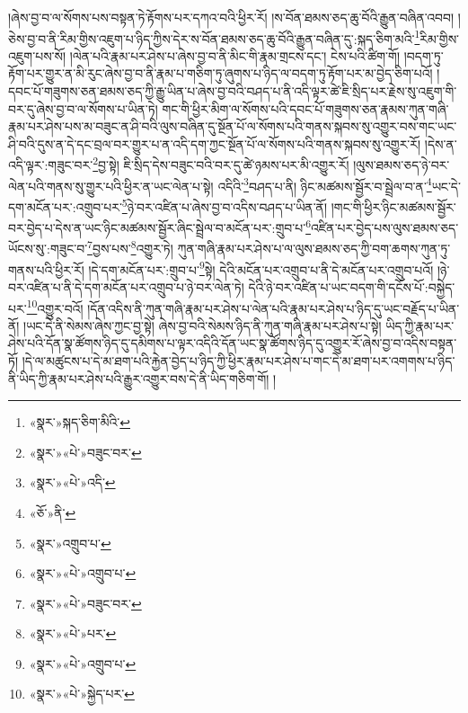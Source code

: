 །ཞེས་བྱ་བ་ལ་སོགས་པས་བསྟན་ཏེ་རྟོགས་པར་དཀའ་བའི་ཕྱིར་རོ། །ས་བོན་ཐམས་ཅད་ཆུ་བོའི་རྒྱུན་བཞིན་འབབ། །ཅེས་བྱ་བ་ནི་རིམ་གྱིས་འཇུག་པ་ཉིད་ཀྱིས་དེར་ས་བོན་ཐམས་ཅད་ཆུ་བོའི་རྒྱུན་བཞིན་དུ་:སྐད་ཅིག་མའི་\footnote{«སྣར་»སྐད་ཅིག་མིའི་}རིམ་གྱིས་འཇུག་པས་སོ། །ལེན་པའི་རྣམ་པར་ཤེས་པ་ཞེས་བྱ་བ་ནི་མིང་གི་རྣམ་གྲངས་དང་། ངེས་པའི་ཚིག་གོ། །བདག་ཏུ་རྟོག་པར་གྱུར་ན་མི་རུང་ཞེས་བྱ་བ་ནི་རྣམ་པ་གཅིག་ཏུ་ཞུགས་པ་ཉིད་ལ་བདག་ཏུ་རྟོག་པར་མ་བྱེད་ཅིག་པའོ། །དབང་པོ་གཟུགས་ཅན་ཐམས་ཅད་ཀྱི་རྒྱུ་ཡིན་པ་ཞེས་བྱ་བའི་བཤད་པ་ནི་འདི་ལྟར་ཚེ་ཇི་སྲིད་པར་རྗེས་སུ་འཇུག་གི་བར་དུ་ཞེས་བྱ་བ་ལ་སོགས་པ་ཡིན་ཏེ། གང་གི་ཕྱིར་མིག་ལ་སོགས་པའི་དབང་པོ་གཟུགས་ཅན་རྣམས་ཀུན་གཞི་རྣམ་པར་ཤེས་པས་མ་བཟུང་ན་ཤི་བའི་ལུས་བཞིན་དུ་སྔོན་པོ་ལ་སོགས་པའི་གནས་སྐབས་སུ་འགྱུར་བས་གང་ཡང་ཤི་བའི་དུས་ན་དེ་དང་བྲལ་བར་གྱུར་པ་ན་འདི་དག་ཀྱང་སྔོན་པོ་ལ་སོགས་པའི་གནས་སྐབས་སུ་འགྱུར་རོ། །དེས་ན་འདི་ལྟར་:གཟུང་བར་\footnote{«སྣར་»«པེ་»བཟུང་བར་}བྱ་སྟེ། ཇི་སྲིད་དེས་བཟུང་བའི་བར་དུ་ཚེ་ཉམས་པར་མི་འགྱུར་རོ། །ལུས་ཐམས་ཅད་ཉེ་བར་ལེན་པའི་གནས་སུ་གྱུར་པའི་ཕྱིར་ན་ཡང་ལེན་པ་སྟེ། འདིའི་\footnote{«སྣར་»«པེ་»འདི་}བཤད་པ་ནི། ཉིང་མཚམས་སྦྱོར་བ་སྦྲེལ་བ་ན་\footnote{«ཅོ་»ནི་}ཡང་དེ་དག་མངོན་པར་:འགྲུབ་པར་\footnote{«སྣར་»འགྲུབ་པ་}ཉེ་བར་འཛིན་པ་ཞེས་བྱ་བ་འདིས་བཤད་པ་ཡིན་ནོ། །གང་གི་ཕྱིར་ཉིང་མཚམས་སྦྱོར་བར་བྱེད་པ་དེས་ན་ཡང་ཉིང་མཚམས་སྦྱོར་ཞིང་སྦྲེལ་བ་མངོན་པར་:གྲུབ་པ་\footnote{«སྣར་»«པེ་»འགྲུབ་པ་}འཛིན་པར་བྱེད་པས་ལུས་ཐམས་ཅད་ཡོངས་སུ་:གཟུང་བ་\footnote{«སྣར་»«པེ་»བཟུང་བར་}བྱས་པས་\footnote{«སྣར་»«པེ་»པར་}འགྱུར་ཏེ། ཀུན་གཞི་རྣམ་པར་ཤེས་པ་ལ་ལུས་ཐམས་ཅད་ཀྱི་བག་ཆགས་ཀུན་ཏུ་གནས་པའི་ཕྱིར་རོ། །དེ་དག་མངོན་པར་:གྲུབ་པ་\footnote{«སྣར་»«པེ་»འགྲུབ་པ་}སྟེ། དེའི་མངོན་པར་འགྲུབ་པ་ནི་དེ་མངོན་པར་འགྲུབ་པའོ། །ཉེ་བར་འཛིན་པ་ནི་དེ་དག་མངོན་པར་འགྲུབ་པ་ཉེ་བར་ལེན་ཏེ། དེའི་ཉེ་བར་འཛིན་པ་ཡང་བདག་གི་དངོས་པོ་:བསྐྱེད་པར་\footnote{«སྣར་»«པེ་»སྐྱེད་པར་}འགྱུར་བའོ། །དོན་འདིས་ནི་ཀུན་གཞི་རྣམ་པར་ཤེས་པ་ལེན་པའི་རྣམ་པར་ཤེས་པ་ཉིད་དུ་ཡང་བརྗོད་པ་ཡིན་ནོ། །ཡང་དེ་ནི་སེམས་ཞེས་ཀྱང་བྱ་སྟེ། ཞེས་བྱ་བའི་སེམས་ཉིད་ནི་ཀུན་གཞི་རྣམ་པར་ཤེས་པ་སྟེ། ཡིད་ཀྱི་རྣམ་པར་ཤེས་པའི་དོན་སྣ་ཚོགས་ཉིད་དུ་དམིགས་པ་ལྟར་འདིའི་དོན་ཡང་སྣ་ཚོགས་ཉིད་དུ་འགྱུར་རོ་ཞེས་བྱ་བ་འདིས་བསྟན་ཏོ། །དེ་ལ་མཚུངས་པ་དེ་མ་ཐག་པའི་རྐྱེན་བྱེད་པ་ཉིད་ཀྱི་ཕྱིར་རྣམ་པར་ཤེས་པ་གང་དེ་མ་ཐག་པར་འགགས་པ་ཉིད་ནི་ཡིད་ཀྱི་རྣམ་པར་ཤེས་པའི་རྒྱུར་འགྱུར་བས་དེ་ནི་ཡིད་གཅིག་གོ། །

